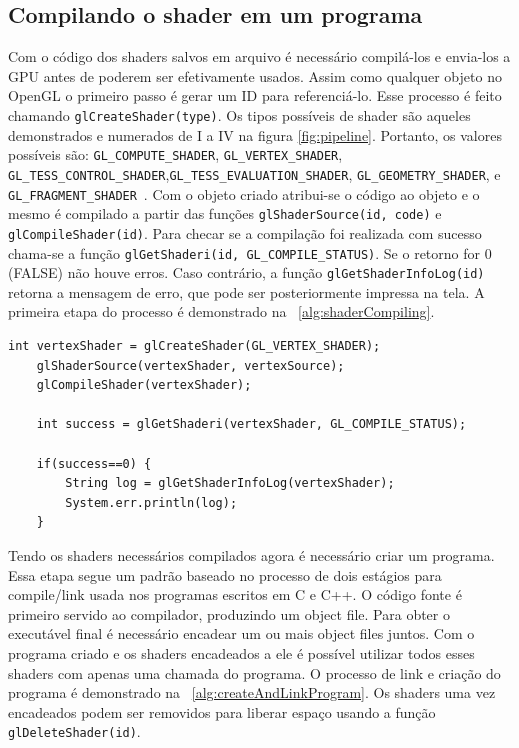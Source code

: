 \documentclass[12pt, 
openright, 
oneside, 
a4paper,    
brazil]{facom-ufu-abntex2}
\begin{document}
\subsection{Compilando o shader em um programa}
Com o código dos shaders salvos em arquivo é necessário compilá-los e envia-los a GPU antes de poderem ser efetivamente usados. Assim como qualquer objeto no OpenGL o primeiro passo é gerar um ID para referenciá-lo. Esse processo é feito chamando \texttt{glCreateShader(type)}. Os tipos possíveis de shader são aqueles demonstrados e numerados de I a IV na figura \ref{fig:pipeline}. Portanto, os valores possíveis são: \texttt{GL_COMPUTE_SHADER},  \texttt{GL_VERTEX_SHADER},  \texttt{GL_TESS_CONTROL_SHADER},\linebreak  \texttt{GL_TESS_EVALUATION_SHADER},  \texttt{GL_GEOMETRY_SHADER}, e  \texttt{GL_FRAGMENT_SHADER}~\cite{openGLShaderCompilation}. Com o objeto criado atribui-se o código ao objeto e o mesmo é compilado a partir das funções \texttt{glShaderSource(id, code)} e \texttt{glCompileShader(id)}. Para checar se a compilação foi realizada com sucesso chama-se a função \texttt{glGetShaderi(id, GL_COMPILE_STATUS)}. Se o retorno for 0 (FALSE) não houve erros. Caso contrário, a função \texttt{glGetShaderInfoLog(id)} retorna a mensagem de erro, que pode ser posteriormente impressa na tela. A primeira etapa do processo é demonstrado na \lstlistingname~\ref{alg:shaderCompiling}.

 \begin{lstlisting}[caption=Processo de compilação do shader, label={alg:shaderCompiling}]
	int vertexShader = glCreateShader(GL_VERTEX_SHADER);
	glShaderSource(vertexShader, vertexSource);
	glCompileShader(vertexShader);
	
	int success = glGetShaderi(vertexShader, GL_COMPILE_STATUS);
			
	if(success==0) {
		String log = glGetShaderInfoLog(vertexShader);
		System.err.println(log);
	}
\end{lstlisting}

Tendo os shaders necessários compilados agora é necessário criar um programa. Essa etapa segue um padrão baseado no processo de dois estágios para compile/link usada nos programas escritos em C e C++. O código fonte é primeiro servido ao compilador, produzindo um object file. Para obter o executável final é necessário encadear um ou mais object files juntos. Com o programa criado e os shaders encadeados a ele é possível utilizar todos esses shaders com apenas uma chamada do programa. O processo de link e criação do programa é demonstrado na \lstlistingname~\ref{alg:createAndLinkProgram}. Os shaders uma vez encadeados podem ser removidos para liberar espaço usando a função \texttt{glDeleteShader(id)}.
\end{document}
